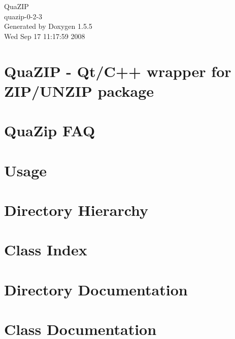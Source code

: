 \documentclass[a4paper]{book}
\begin{document}
\begin{titlepage}
\vspace*{7cm}
\begin{center}
{\Large QuaZIP \\[1ex]\large quazip-0-2-3 }\\
\vspace*{1cm}
{\large Generated by Doxygen 1.5.5}\\
\vspace*{0.5cm}
{\small Wed Sep 17 11:17:59 2008}\\
\end{center}
\end{titlepage}
\clearemptydoublepage
{}
\tableofcontents
\clearemptydoublepage
{}
\chapter{QuaZIP - Qt/C++ wrapper for ZIP/UNZIP package }
\label{index}
\chapter{QuaZip FAQ}

\chapter{Usage}

\chapter{Directory Hierarchy}

\chapter{Class Index}

\chapter{Directory Documentation}





\chapter{Class Documentation}




\printindex
\end{document}
